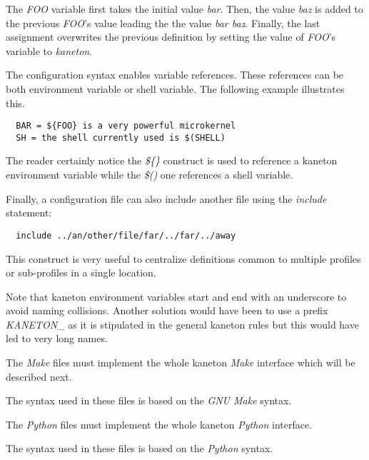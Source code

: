 The \textit{FOO} variable first takes the initial value \textit{bar}. Then,
the value \textit{baz} is added to the previous \textit{FOO}'s value
leading the the value \textit{bar baz}. Finally, the last assignment
overwrites the previous definition by setting the value of \textit{FOO}'s
variable to \textit{kaneton}.

The configuration syntax enables variable references. These references can
be both environment variable or shell variable. The following example
illustrates this.

\begin{verbatim}
  BAR = ${FOO} is a very powerful microkernel
  SH = the shell currently used is $(SHELL)
\end{verbatim}

The reader certainly notice the \textit{\$\{\}} construct is used to reference
a kaneton environment variable while the \textit{\$()} one references a shell
variable.

Finally, a configuration file can also include another file using the
\textit{include} statement:

\begin{verbatim}
  include ../an/other/file/far/../far/../away
\end{verbatim}

This construct is very useful to centralize definitions common to multiple
profiles or sub-profiles in a single location.

Note that kaneton environment variables start and end with an underscore
to avoid naming collisions. Another solution would have been to use a
prefix \textit{KANETON\_} as it is stipulated in the general kaneton rules
but this would have led to very long names.



The \textit{Make} files must implement the whole kaneton \textit{Make}
interface which will be described next.

The syntax used in these files is based on the \textit{GNU Make} syntax.



The \textit{Python} files must implement the whole kaneton \textit{Python}
interface.

The syntax used in these files is based on the \textit{Python} syntax.

%
%

